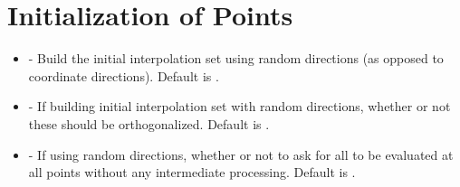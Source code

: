 \documentclass[letterpaper,10pt,english]{sphinxmanual}
\begin{document}
\section{Initialization of Points}
\label{\detokenize{advanced:initialization-of-points}}\begin{itemize}
\item {} 
 - Build the initial interpolation set using random directions (as opposed to coordinate directions). Default is .

\item {} 
 - If building initial interpolation set with random directions, whether or not these should be orthogonalized. Default is .

\item {} 
 - If using random directions, whether or not to ask for all  to be evaluated at all points without any intermediate processing. Default is .

\end{itemize}
\end{document}
